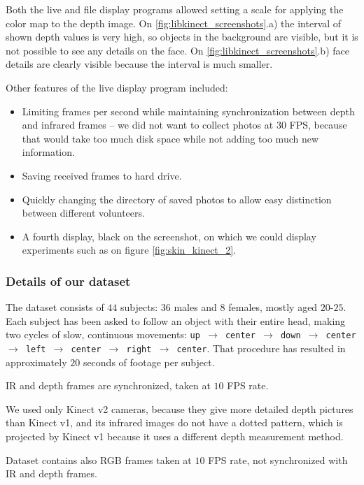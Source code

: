     Both the live and file display programs allowed setting a scale for applying the color
    map to the depth image. On \ref{fig:libkinect_screenshots}.a) the interval of shown
    depth values is very high, so objects in the background are visible, but it is not
    possible to see any details on the face. On \ref{fig:libkinect_screenshots}.b)
    face details are clearly visible because the interval is much smaller.

    Other features of the live display program included:
    \begin{itemize}
        \item Limiting frames per second while maintaining synchronization
        between depth and infrared frames -- we did not want to collect photos at 30 FPS,
        because that would take too much disk space while not adding too much new
        information.
        \item Saving received frames to hard drive.
        \item Quickly changing the directory of saved photos to allow easy distinction
        between different volunteers.
        \item A fourth display, black on the screenshot, on which we could display
        experiments such as on figure \ref{fig:skin_kinect_2}.
    \end{itemize}


    \subsubsection*{Details of our dataset}
    The dataset consists of $44$ subjects: $36$ males and
    $8$ females, mostly aged $20$-$25$. Each subject has been asked to
    follow an object with their entire head, making two cycles of slow,
    continuous movements: \texttt{up $\to$ center $\to$ down $\to$ center $\to$
    left $\to$ center $\to$ right $\to$ center}.
    That procedure has resulted in approximately $20$ seconds of footage per
    subject.

    IR and depth frames are synchronized, taken at $10$ FPS rate.

    We used only Kinect v2 cameras, because they give more detailed depth pictures
    than Kinect v1, and its infrared images do not have a dotted pattern,
    which is projected by Kinect v1 because it uses a different depth
    measurement method.

    Dataset contains also RGB frames taken at $10$ FPS rate, not synchronized
    with IR and depth frames.

